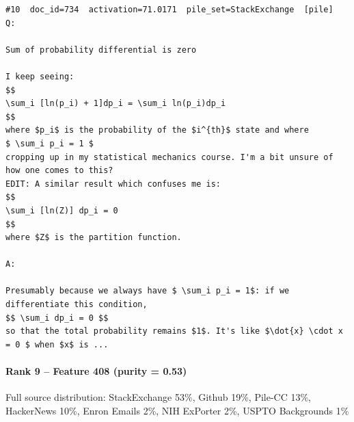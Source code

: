 \begin{verbatim}
#10  doc_id=734  activation=71.0171  pile_set=StackExchange  [pile]
Q:

Sum of probability differential is zero

I keep seeing:
$$
\sum_i [ln(p_i) + 1]dp_i = \sum_i ln(p_i)dp_i
$$
where $p_i$ is the probability of the $i^{th}$ state and where
$ \sum_i p_i = 1 $
cropping up in my statistical mechanics course. I'm a bit unsure of how one comes to this?
EDIT: A similar result which confuses me is:
$$
\sum_i [ln(Z)] dp_i = 0
$$
where $Z$ is the partition function.

A:

Presumably because we always have $ \sum_i p_i = 1$: if we differentiate this condition,
$$ \sum_i dp_i = 0 $$
so that the total probability remains $1$. It's like $\dot{x} \cdot x = 0 $ when $x$ is ...

\end{verbatim}

\paragraph*{Rank 9 -- Feature 408 (purity = 0.53)}

Full source distribution: StackExchange 53\%, Github 19\%, Pile-CC 13\%, HackerNews 10\%, Enron Emails 2\%, NIH ExPorter 2\%, USPTO Backgrounds 1\%

